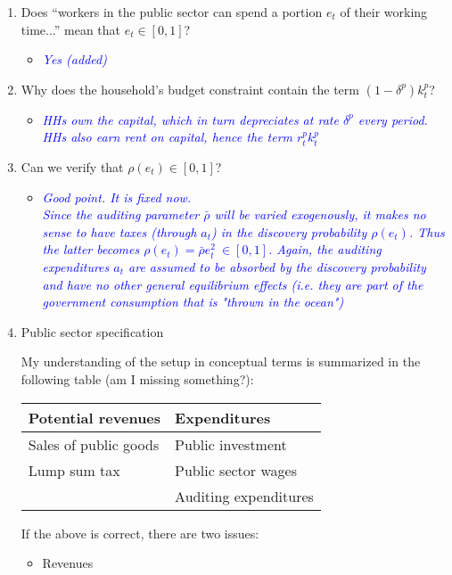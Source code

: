 \documentclass[]{scrartcl}
\begin{document}
\begin{enumerate}
\item Does ``workers in the public sector can spend a portion $ e_t $ of their working time...'' mean that $e_t \in [0,1]$?
\begin{itemize}
\item \textcolor{blue}{\textit{Yes (added)}}
\end{itemize}
\item Why does the household's budget constraint contain the term $ (1-\delta^p)k^p_t $?
\begin{itemize}
\item \textcolor{blue}{\textit{HHs own the capital, which in turn depreciates at rate $ \delta^p $ every period. HHs also earn rent on capital, hence the term $ r^p_t k_t^p $}}
\end{itemize}
\item Can we verify that $ \rho(e_t) \in [0,1] $?
\begin{itemize}
\item \textcolor{blue}{\textit{Good point. It is fixed now.\\ Since the auditing parameter $ \bar{\rho} $ will be varied exogenously, it makes no sense to have taxes (through $ a_t $) in the discovery probability $ \rho(e_t) $. Thus the latter becomes $ \rho(e_t)=\bar{\rho}e_t^2~\in[0,1] $. Again, the auditing expenditures $ a_t $ are assumed to be absorbed by the discovery probability and have no other general equilibrium effects (i.e. they are part of the government consumption that is "thrown in the ocean")}}
\end{itemize}
\item Public sector specification

My understanding of the setup in conceptual terms is summarized in the following table (am I missing something?):

\begin{tabular}{l|l}
\hline
Potential revenues & Expenditures \\ \hline
Sales of public goods & Public investment \\
Lump sum tax & Public sector wages \\
{} & Auditing expenditures
\end{tabular}

If the above is correct, there are two issues:
\begin{itemize}
\item Revenues


\end{itemize}
\end{enumerate}
\end{document}
